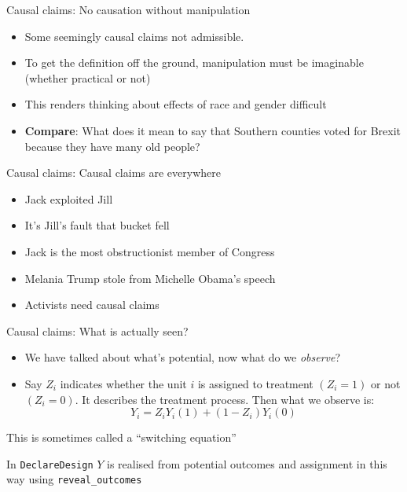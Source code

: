 \documentclass[
  11pt,
  ignorenonframetext,
]{beamer}
\providecommand{\tightlist}{%
  \setlength{\itemsep}{0pt}\setlength{\parskip}{0pt}}\usepackage{longtable,booktabs,array}
\begin{document}
\begin{frame}{Causal claims: No causation without manipulation}
\protect\hypertarget{causal-claims-no-causation-without-manipulation-1}{}
\begin{itemize}
\tightlist
\item
  Some seemingly causal claims not admissible.
\item
  To get the definition off the ground, manipulation must be imaginable
  (whether practical or not)
\item
  This renders thinking about effects of race and gender difficult
\item
  \textbf{Compare}: What does it mean to say that Southern counties
  voted for Brexit because they have many old people?
\end{itemize}
\end{frame}

\begin{frame}{Causal claims: Causal claims are everywhere}
\protect\hypertarget{causal-claims-causal-claims-are-everywhere}{}
\begin{itemize}
\item
  Jack exploited Jill
\item
  It's Jill's fault that bucket fell
\item
  Jack is the most obstructionist member of Congress
\item
  Melania Trump stole from Michelle Obama's speech
\item
  Activists need causal claims
\end{itemize}
\end{frame}

\begin{frame}[fragile]{Causal claims: What is actually seen?}
\protect\hypertarget{causal-claims-what-is-actually-seen}{}
\begin{itemize}
\tightlist
\item
  We have talked about what's potential, now what do we \emph{observe}?
\item
  Say \(Z_i\) indicates whether the unit \(i\) is assigned to treatment
  \((Z_i=1)\) or not \((Z_i=0)\). It describes the treatment process.
  Then what we observe is: \[ Y_i = Z_iY_i(1) + (1-Z_i)Y_i(0) \]
\end{itemize}

This is sometimes called a ``switching equation''

In \texttt{DeclareDesign} \(Y\) is realised from potential outcomes and
assignment in this way using \texttt{reveal\_outcomes}
\end{frame}
\end{document}
